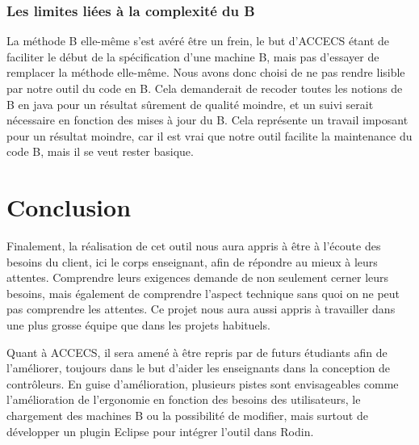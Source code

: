 \documentclass{article}
\begin{document}
\subsubsection{Les limites liées à la complexité du B}
    La méthode B elle-même s'est avéré être un frein, le but d'ACCECS étant de faciliter le début de la spécification d'une machine B, mais pas d'essayer de remplacer la méthode elle-même. Nous avons donc choisi de ne pas rendre lisible par notre outil du code en B. Cela demanderait de recoder toutes les notions de B en java pour un résultat sûrement de qualité moindre, et un suivi serait nécessaire en fonction des mises à jour du B. Cela représente un travail imposant pour un résultat moindre, car il est vrai que notre outil facilite la maintenance du code B, mais il se veut rester basique.
    
\section*{Conclusion}
    Finalement, la réalisation de cet outil nous aura appris à être à l'écoute des besoins du client, ici le corps enseignant, afin de répondre au mieux à leurs attentes. Comprendre leurs exigences demande de non seulement cerner leurs besoins, mais également de comprendre l'aspect technique sans quoi on ne peut pas comprendre les attentes. Ce projet nous aura aussi appris à travailler dans une plus grosse équipe que dans les projets habituels. 

    \bigskip

    Quant à ACCECS, il sera amené à être repris par de futurs étudiants afin de l'améliorer, toujours dans le but d'aider les enseignants dans la conception de contrôleurs. En guise d'amélioration, plusieurs pistes sont envisageables comme l'amélioration de l'ergonomie en fonction des besoins des utilisateurs, le chargement des machines B ou la possibilité de modifier, mais surtout de développer un plugin Eclipse pour intégrer l'outil dans Rodin.
\end{document}
